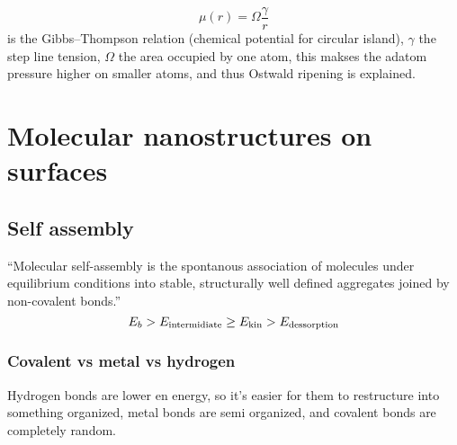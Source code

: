 \documentclass[article,oneside]{memoir}
\begin{document}
$$\mu(r)=\Omega\frac{\gamma}{r}$$ is the Gibbs--Thompson relation (chemical potential for circular island), $\gamma$ the step line tension, $\Omega$ the area occupied by one atom, this makses the adatom pressure higher on smaller atoms, and thus Ostwald ripening is explained.

\part{Molecular nanostructures on surfaces}

\chapter{Self assembly}
``Molecular self-assembly is the spontanous association of
molecules under equilibrium conditions into stable, structurally
well defined aggregates joined by non-covalent bonds.''
\begin{equation*}
        E_b> E_{\textup{intermidiate}}\geq E_{\textup{kin}} > E_{\textup{dessorption}}
\end{equation*}


\section{Covalent  vs metal vs hydrogen}
Hydrogen bonds are lower en energy, so it's easier for them to restructure into something organized, metal bonds are semi organized, and covalent bonds are completely random.
\end{document}
